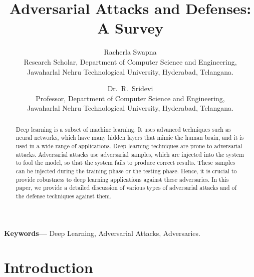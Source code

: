 \documentclass[12pt]{article}
\title{Adversarial Attacks and Defenses: A Survey}
\author{%
  \begin{tabular}[t]{c}
    Racherla Swapna\\
    Research Scholar, Department of Computer Science and Engineering,\\
    Jawaharlal Nehru Technological University, Hyderabad, Telangana.
  \end{tabular}
  \and
  \begin{tabular}[t]{c}
    Dr.\ R.\ Sridevi\\
    Professor, Department of Computer Science and Engineering,\\
    Jawaharlal Nehru Technological University, Hyderabad, Telangana.
  \end{tabular}%
}
\date{}
\begin{document}
\maketitle

\begin{abstract}\normalsize
Deep learning is a subset of machine learning. It uses advanced techniques such as neural networks, which have many hidden layers that mimic the human brain, and it is used in a wide range of applications. Deep learning techniques are prone to adversarial attacks. Adversarial attacks use adversarial samples, which are injected into the system to fool the model, so that the system fails to produce correct results. These samples can be injected during the training phase or the testing phase. Hence, it is crucial to provide robustness to deep learning applications against these adversaries. In this paper, we provide a detailed discussion of various types of adversarial attacks and of the defense techniques against them.
\end{abstract}

\noindent\textbf{Keywords---} Deep Learning, Adversarial Attacks, Adversaries.

\section{Introduction}
\end{document}
